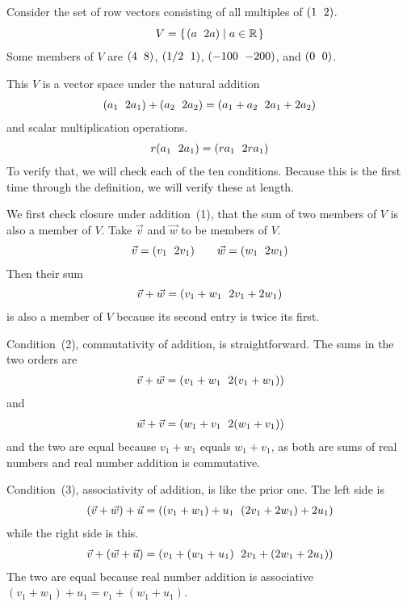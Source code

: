 \documentclass[10pt,t]{beamer}
\begin{document}
\begin{frame}
\ex
Consider the set of row vectors
consisting of all multiples of $\rowvec{1 &2}$.
\begin{equation*}
  V=\set{\rowvec{a  &2a}\suchthat a\in\Re}
\end{equation*}
Some members of $V$ are $\rowvec{4 &8}$, $\rowvec{1/2 &1}$,
$\rowvec{-100 &-200}$, and $\rowvec{0 &0}$.

\pause
This $V$
is a vector space under the natural addition
\begin{equation*}
  \rowvec{a_1 &2a_1}+\rowvec{a_2 &2a_2}
  =
  \rowvec{a_1+a_2 &2a_1+2a_2}
\end{equation*}
and scalar multiplication operations.
\begin{equation*}
  r\rowvec{a_1 &2a_1}
  =
  \rowvec{ra_1 &2ra_1}
\end{equation*}
To verify that, we will check each of the ten conditions.
Because this is the first time through the definition,
we will verify these at length.
\end{frame}\begin{frame}
We first check closure under addition~(1),
that the sum of two members of $V$
is also a member of $V$.
Take $\vec{v}$ and  $\vec{w}$ to be members of $V$.
\begin{equation*}
  \vec{v}=\rowvec{v_1 &2v_1}
  \qquad
  \vec{w}=\rowvec{w_1 &2w_1}  
\end{equation*}
Then their sum
\begin{equation*}
  \vec{v}+\vec{w}=
  \rowvec{v_1+w_1 &2v_1+2w_1}
\end{equation*} 
is also a member of $V$ because its second entry is twice its first.

\pause
Condition~(2), commutativity of addition, is straightforward.
The sums in the two orders are
\begin{equation*}
  \vec{v}+\vec{w}=\rowvec{v_1+w_1 &2(v_1+w_1)}
\end{equation*}
and
\begin{equation*}
  \vec{w}+\vec{v}
  =
  \rowvec{w_1+v_1 &2(w_1+v_1)}  
\end{equation*}
and the two are equal because 
$v_1+w_1$ equals $w_1+v_1$, as both are sums of real numbers
and real number addition is commutative.
\end{frame}\begin{frame}
Condition~(3), associativity of addition, is like the prior one.
The left side is 
\begin{equation*}
  (\vec{v}+\vec{w})+\vec{u}=\rowvec{(v_1+w_1)+u_1 &(2v_1+2w_1)+2u_1}
\end{equation*}
while the right side is this.
\begin{equation*}
  \vec{v}+(\vec{w}+\vec{u})
  =
  \rowvec{v_1+(w_1+u_1) &2v_1+(2w_1+2u_1)}  
\end{equation*}
The two are equal because real number addition is associative 
$(v_1+w_1)+u_1=v_1+(w_1+u_1)$.


\end{frame}
\end{document}
